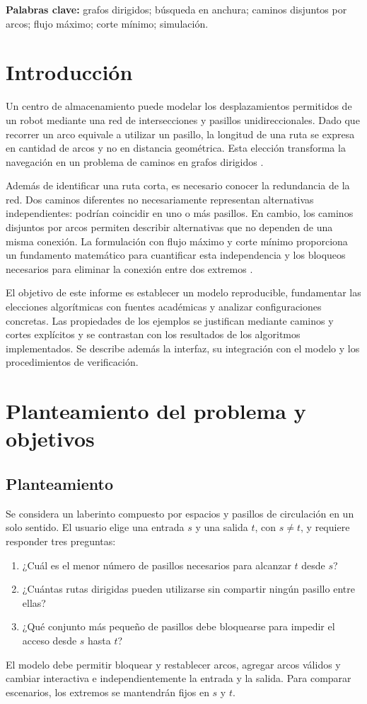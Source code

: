 \documentclass[11pt,a4paper]{article}
\begin{document}
\textbf{Palabras clave:} grafos dirigidos; búsqueda en anchura; caminos disjuntos por arcos; flujo máximo; corte mínimo; simulación.
\tableofcontents
\clearpage
{}

\section{Introducción}
Un centro de almacenamiento puede modelar los desplazamientos permitidos de un robot mediante una red de intersecciones y pasillos unidireccionales. Dado que recorrer un arco equivale a utilizar un pasillo, la longitud de una ruta se expresa en cantidad de arcos y no en distancia geométrica. Esta elección transforma la navegación en un problema de caminos en grafos dirigidos \cite{kleinberg2006,sedgewick2011}.

Además de identificar una ruta corta, es necesario conocer la redundancia de la red. Dos caminos diferentes no necesariamente representan alternativas independientes: podrían coincidir en uno o más pasillos. En cambio, los caminos disjuntos por arcos permiten describir alternativas que no dependen de una misma conexión. La formulación con flujo máximo y corte mínimo proporciona un fundamento matemático para cuantificar esta independencia y los bloqueos necesarios para eliminar la conexión entre dos extremos \cite{ford1956,kleinberg2006}.

El objetivo de este informe es establecer un modelo reproducible, fundamentar las elecciones algorítmicas con fuentes académicas y analizar configuraciones concretas. Las propiedades de los ejemplos se justifican mediante caminos y cortes explícitos y se contrastan con los resultados de los algoritmos implementados. Se describe además la interfaz, su integración con el modelo y los procedimientos de verificación.

\section{Planteamiento del problema y objetivos}
\subsection{Planteamiento}
Se considera un laberinto compuesto por espacios y pasillos de circulación en un solo sentido. El usuario elige una entrada $s$ y una salida $t$, con $s\ne t$, y requiere responder tres preguntas:
\begin{enumerate}[label=\arabic*)]
\item ¿Cuál es el menor número de pasillos necesarios para alcanzar $t$ desde $s$?
\item ¿Cuántas rutas dirigidas pueden utilizarse sin compartir ningún pasillo entre ellas?
\item ¿Qué conjunto más pequeño de pasillos debe bloquearse para impedir el acceso desde $s$ hasta $t$?
\end{enumerate}
El modelo debe permitir bloquear y restablecer arcos, agregar arcos válidos y cambiar interactiva e independientemente la entrada y la salida. Para comparar escenarios, los extremos se mantendrán fijos en $s$ y $t$.
\end{document}
